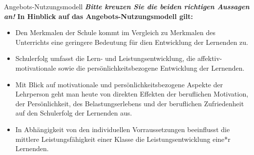 \documentclass[a4paper]{article}
\newcommand{\ACorrectAnswer}{\rlap{$\square$}{\raisebox{2pt}{\large\hspace{1pt}\ding{51}}}\hspace{-2.5pt}}
\newcommand{\AWrongAnswer}{\rlap{$\square$}{\large\hspace{1pt}\ding{55}}}
\newcommand{\AnUnsureAnswer}{\rlap{$\square$}{\large\hspace{1pt}\textbf?}}
\newcommand{\defaultCorrect}{\ding{51}}
\newcommand{\defaultWrong}{\ding{55}}
\newcommand{\defaultUnsure}{\textbf{?}}
\newenvironment{answers}{\begin{itemize}}{\end{itemize}}
\newcommand{\correct}{\defaultCorrect}
\newcommand{\wrong}{\defaultWrong}
\newcommand{\unsure}{\defaultUnsure}
\newenvironment{question}[2]{%
    \section[#1 \normalfont(#2)]{#1\\\small\normalfont\hyperlink{tableofcontents}{zurück zum Inhaltsverzeichnis}}%
}{%
    \newpage%
}
\newcommand{\questiontext}[1]{\textbf{#1}}
\newcommand{\assignment}[1]{\textbf{\textit{#1}}\newline}
\newenvironment{multiple-choice}[1]{%
    \begin{question}{#1}{Multiple Choice}%
    \renewenvironment{answers}{%
        \begin{multiple-choice-list}}{\end{multiple-choice-list}%
    }%
    \renewcommand{\correct}{\ACorrectAnswer}%
    \renewcommand{\wrong}{\AWrongAnswer}%
    \renewcommand{\unsure}{\AnUnsureAnswer}%
}%
{%
    \renewcommand{\correct}{\defaultCorrect}%
    \renewcommand{\wrong}{\defaultWrong}%
    \renewcommand{\unsure}{\defaultUnsure}%
    \end{question}%
}
\begin{document}
\begin{multiple-choice}{Angebots-Nutzungsmodell}
    \assignment{Bitte kreuzen Sie die beiden richtigen Aussagen an!}
    \questiontext{In Hinblick auf das Angebots-Nutzungsmodell gilt:}
    \begin{answers}
        \item[\correct] Den Merkmalen der Schule kommt im Vergleich zu Merkmalen des Unterrichts eine geringere Bedeutung für dien Entwicklung der Lernenden zu.
        \item[\correct] Schulerfolg umfasst die Lern- und Leistungsentwicklung, die affektiv- motivationale sowie die persönlichkeitsbezogene Entwicklung der Lernenden.
        \item[\wrong] Mit Blick auf motivationale und persönlichkeitsbezogene Aspekte der Lehrperson geht man heute von direkten Effekten der beruflichen Motivation, der Persönlichkeit, des Belastungserlebens und der beruflichen Zufriedenheit auf den Schulerfolg der Lernenden aus.
        \item[\wrong] In Abhängigkeit von den individuellen Vorraussetzungen beeinflusst die mittlere Leistungsfähigkeit einer Klasse die Leistungsentwicklung eine*r Lernenden.
    \end{answers}
\end{multiple-choice}
\end{document}
